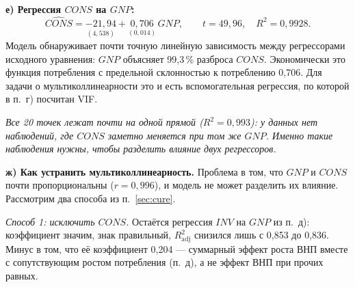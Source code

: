 \begin{solution}
\medskip
\textbf{е) Регрессия $\mathit{CONS}$ на $\mathit{GNP}$:}
\[
  \widehat{\mathit{CONS}} = \underset{(4{,}538)}{-21{,}94}
                          + \underset{(0{,}014)}{0{,}706}\,\mathit{GNP},
  \qquad t = 49{,}96,\quad R^2 = 0{,}9928 .
\]
Модель обнаруживает почти точную линейную зависимость между регрессорами
исходного уравнения: $\mathit{GNP}$ объясняет 99,3\,\% разброса
$\mathit{CONS}$. Экономически это функция потребления с предельной склонностью
к потреблению 0,706. Для задачи о мультиколлинеарности это и есть
вспомогательная регрессия, по которой в п.~г) посчитан VIF.

\begin{center}

\smallskip
{\small\itshape Все 20 точек лежат почти на одной прямой ($R^2 = 0{,}993$):
у данных нет наблюдений, где $\mathit{CONS}$ заметно меняется при том же
$\mathit{GNP}$. Именно такие наблюдения нужны, чтобы разделить влияние двух
регрессоров.\par}
\end{center}

\medskip
\textbf{ж) Как устранить мультиколлинеарность.} Проблема в том, что
$\mathit{GNP}$ и $\mathit{CONS}$ почти пропорциональны ($r = 0{,}996$), и модель
не может разделить их влияние. Рассмотрим два способа из п.~\ref{sec:cure}.

\medskip
\emph{Способ 1: исключить $\mathit{CONS}$.} Остаётся регрессия $\mathit{INV}$
на $\mathit{GNP}$ из п.~д): коэффициент значим, знак правильный,
$R^2_{\text{adj}}$ снизился лишь с 0,853 до 0,836. Минус в том, что её
коэффициент 0,204 — суммарный эффект роста ВНП вместе с сопутствующим ростом
потребления (п.~д), а не эффект ВНП при прочих равных.


\end{solution}
